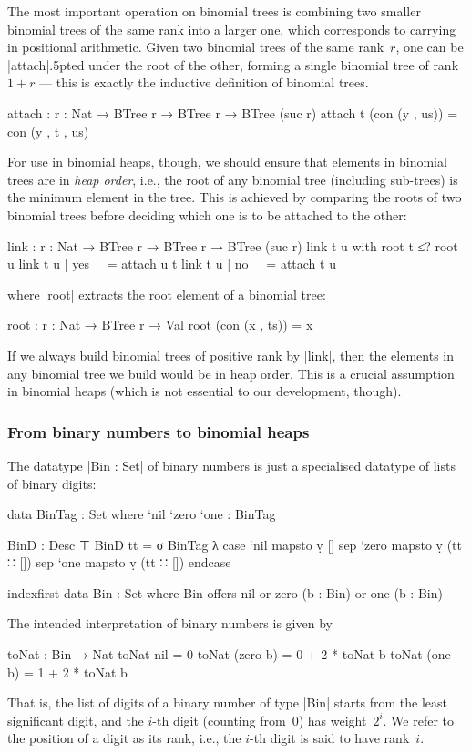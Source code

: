 The most important operation on binomial trees is combining two smaller binomial trees of the same rank into a larger one, which corresponds to carrying in positional arithmetic.
Given two binomial trees of the same rank~$r$, one can be |attach|{\kern.5pt}ed under the root of the other, forming a single binomial tree of rank $1+r$ --- this is exactly the inductive definition of binomial trees.
\begin{code}
attach : {r : Nat} → BTree r → BTree r → BTree (suc r)
attach t (con (y , us)) = con (y , t , us)
\end{code}
For use in binomial heaps, though, we should ensure that elements in binomial trees are in \emph{heap order}, i.e., the root of any binomial tree (including sub-trees) is the minimum element in the tree.
This is achieved by comparing the roots of two binomial trees before deciding which one is to be attached to the other:
\begin{code}
link : {r : Nat} → BTree r → BTree r → BTree (suc r)
link t u with root t ≤? root u
link t u | yes  _ = attach u t
link t u | no   _ = attach t u
\end{code}
where |root| extracts the root element of a binomial tree:
\begin{code}
root : {r : Nat} → BTree r → Val
root (con (x , ts)) = x
\end{code}
If we always build binomial trees of positive rank by |link|, then the elements in any binomial tree we build would be in heap order.
This is a crucial assumption in binomial heaps (which is not essential to our development, though).

\subsubsection{From binary numbers to binomial heaps}
The datatype |Bin : Set| of binary numbers is just a specialised datatype of lists of binary digits:
\begin{code}
data BinTag : Set where `nil `zero `one : BinTag

BinD : Desc ⊤
BinD tt = σ BinTag λ  case  `nil   mapsto  ṿ []
                      sep   `zero  mapsto  ṿ (tt ∷ [])
                      sep   `one   mapsto  ṿ (tt ∷ []) endcase

indexfirst data Bin : Set where
  Bin  offers  nil
       or      zero  (b : Bin)
       or      one   (b : Bin)
\end{code}
The intended interpretation of binary numbers is given by
\begin{code}
toNat : Bin → Nat
toNat nil        = 0
toNat (zero  b)  = 0 + 2 * toNat b
toNat (one   b)  = 1 + 2 * toNat b
\end{code}
That is, the list of digits of a binary number of type |Bin| starts from the least significant digit, and the $i$-th digit (counting from~$0$) has weight~$2^i$.
We refer to the position of a digit as its rank, i.e., the $i$-th digit is said to have rank~$i$.

